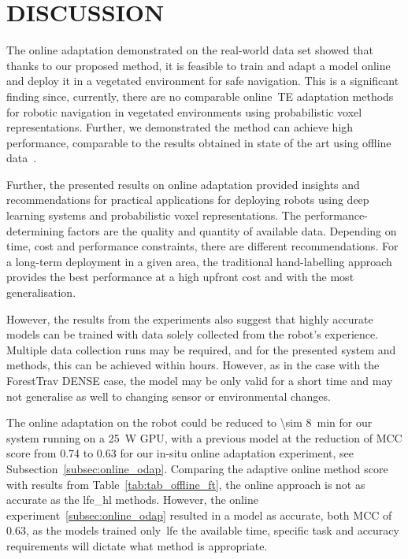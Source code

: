 \section{DISCUSSION}
\label{sec:discussion}
The online adaptation demonstrated on the real-world data set showed that thanks to our proposed method, it is feasible to train and adapt a model online and deploy it in a vegetated environment for safe navigation. This is a significant finding since, currently, there are no comparable online~\ac{TE} adaptation methods for robotic navigation in vegetated environments using probabilistic voxel representations. Further, we demonstrated the method can achieve high performance, comparable to the results obtained in state of the art using offline data~\cite{ruetz2024foresttrav}. 

Further, the presented results on online adaptation provided insights and recommendations for practical applications for deploying robots using deep learning systems and probabilistic voxel representations. The performance-determining factors are the quality and quantity of available data. Depending on time, cost and performance constraints, there are different recommendations. For a long-term deployment in a given area, the traditional hand-labelling approach provides the best performance at a high upfront cost and with the most generalisation. 

However, the results from the experiments also suggest that highly accurate models can be trained with data solely collected from the robot's experience. Multiple data collection runs may be required, and for the presented system and methods, this can be achieved within hours. However, as in the case with the ForestTrav DENSE case, the model may be only valid for a short time and may not generalise as well to changing sensor or environmental changes.

The online adaptation on the robot could be reduced to \qty{\sim 8}{\minute} for our system running on a \qty{25}{\watt} GPU, with a previous model at the reduction of MCC score from 0.74 to 0.63 for our in-situ online adaptation experiment, see Subsection~\ref{subsec:online_odap}. Comparing the adaptive online method score with results from Table~\ref{tab:tab_offline_ft}, the online approach is not as accurate as the \ac{lfe_hl} methods. However, the online experiment~\ref{subsec:online_odap} resulted in a model as accurate, both MCC of 0.63, as the models trained only~\ac{lfe} the available time, specific task and accuracy requirements will dictate what method is appropriate.

